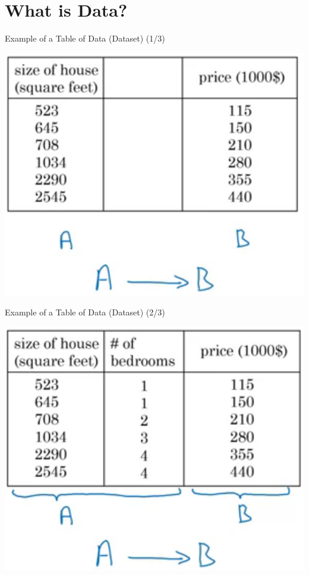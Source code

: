 \documentclass[pdf]{beamer}
\theoremstyle{mystyle}
\begin{document}
\section{What is Data?}
\begin{frame}{Example of a Table of Data (Dataset) (1/3)}
	\begin{table}[!ht]
		\centering
		\includegraphics[scale=.3]{example-dataset-2}
		\caption{House prices dataset~\citep{ng2019AIForEveryone}}
		\label{fig:example-dataset-2}
	\end{table}
\end{frame}


\begin{frame}{Example of a Table of Data (Dataset) (2/3)}
	\begin{table}[!ht]
		\centering
		\includegraphics[scale=.3]{example-dataset-1}
		\caption{House prices dataset~\citep{ng2019AIForEveryone}}
		\label{fig:example-dataset-1}
	\end{table}
\end{frame}
\end{document}
